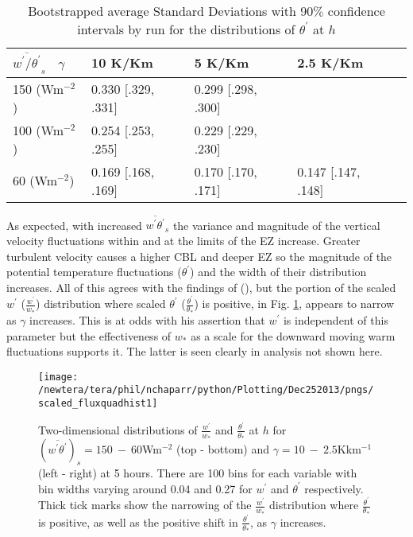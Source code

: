 \begin{table}[htbp]
\caption[]{Bootstrapped average Standard Deviations with 90$\%$ confidence intervals by run for the distributions of $\theta^{'}$ at $h$}
    \begin{tabular}{p{2.2cm}|p{2.2cm}  p{2.2cm}  p{2.2cm} p{2.2cm} }
     $\overline{w^{'}/\theta^{'}}_{s}$ \ $\gamma$ & 10 K/Km & 5 K/Km & 2.5 K/Km  \\ \hline
     150 (Wm$^{-2}$)&  0.330 [.329, .331]& 0.299 [.298, .300]& \\
     100 (Wm$^{-2}$)&  0.254 [.253, .255]& 0.229 [.229, .230]& \\
     60 (Wm$^{-2}$) &  0.169 [.168, .169]& 0.170 [.170, .171]& 0.147 [.147, .148]\\ \hline
    \end{tabular}
\label{tab:stdevtheta}   
\end{table}

As expected, with increased $\overline{w^{'}\theta^{'}}_{s}$ the variance and magnitude of the vertical velocity fluctuations within and at the limits of the EZ increase.  Greater turbulent velocity causes a higher CBL and deeper EZ so the magnitude of the potential temperature fluctuations ($\theta^{'}$) and the width of their distribution increases. All of this agrees with the findings of \citeauthor{Sorbjan1} (\citeyear{Sorbjan1}), but the portion of the scaled $w^{'}$ ($\frac{w^{'}}{w_{*}}$) distribution where scaled $\theta^{'}$ ($\frac{\theta^{'}}{\theta_{*}}$) is positive, in Fig. \ref{fig:scaled_fluxquadhs}, appears to narrow as $\gamma$ increases. This is at odds with his assertion that $w^{'}$ is independent of this parameter but the effectiveness of $w_{*}$ as a scale for the downward moving warm fluctuations supports it. The latter is seen clearly in analysis not shown here.\\


\begin{figure}[htbp]
\centering
 \texttt{[image: /newtera/tera/phil/nchaparr/python/Plotting/Dec252013/pngs/scaled\_fluxquadhist1]}                 
\caption[Two-dimensional Distributions of $\frac{w^{'}}{w_{*}}$ and $\frac{\theta^{'}}{\theta_{*}}$ for all Runs]{Two-dimensional distributions of $\frac{w^{'}}{w_{*}}$ and $\frac{\theta^{'}}{\theta_{*}}$ at $h$ for $(\overline{w^{'}\theta^{'}})_{s} = 150 \ - \ 60$Wm$^{-2}$ (top - bottom) and $\gamma = 10 \ - \  2.5$Kkm$^{-1}$ (left - right) at 5 hours. There are 100 bins for each variable with bin widths varying around 0.04 and 0.27 for $w^{'}$ and $\theta^{'}$ respectively. Thick tick marks show the narrowing of the $\frac{w^{'}}{w_{*}}$ distribution where $\frac{\theta^{'}}{\theta_{*}}$ is positive, as well as the positive shift in $\frac{\theta^{'}}{\theta_{*}}$, as $\gamma$ increases.}
\label{fig:scaled_fluxquadhs}
\end{figure}

